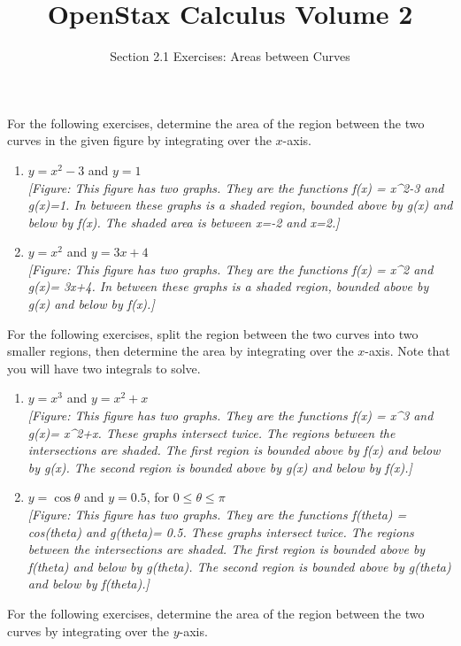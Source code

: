 \documentclass{exercises}
\title{OpenStax Calculus Volume 2}
\subtitle{Section 2.1 Exercises: Areas between Curves}
\author{}
\date{}
\begin{document}
\maketitle


For the following exercises, determine the area of the region between the two curves in the given figure by integrating over the $x$-axis.

\begin{enumerate}[start=1]
\item $y=x^{2}-3$ and $y=1$ \\ \textit{[Figure: This figure has two graphs. They are the functions f(x) = x\textasciicircum{}2-3 and g(x)=1. In between these graphs is a shaded region, bounded above by g(x) and below by f(x). The shaded area is between x=-2 and x=2.]}
\item $y=x^{2}$ and $y=3x+4$ \\ \textit{[Figure: This figure has two graphs. They are the functions f(x) = x\textasciicircum{}2 and g(x)= 3x+4. In between these graphs is a shaded region, bounded above by g(x) and below by f(x).]}
\end{enumerate}

For the following exercises, split the region between the two curves into two smaller regions, then determine the area by integrating over the $x$-axis. Note that you will have two integrals to solve.

\begin{enumerate}[resume]
\item $y=x^{3}$ and $y=x^{2}+x$ \\ \textit{[Figure: This figure has two graphs. They are the functions f(x) = x\textasciicircum{}3 and g(x)= x\textasciicircum{}2+x. These graphs intersect twice. The regions between the intersections are shaded. The first region is bounded above by f(x) and below by g(x). The second region is bounded above by g(x) and below by f(x).]}
\item $y=\cos \theta$ and $y=0.5$, for $0\le \theta \le \pi$ \\ \textit{[Figure: This figure has two graphs. They are the functions f(theta) = cos(theta) and g(theta)= 0.5. These graphs intersect twice. The regions between the intersections are shaded. The first region is bounded above by f(theta) and below by g(theta). The second region is bounded above by g(theta) and below by f(theta).]}
\end{enumerate}

For the following exercises, determine the area of the region between the two curves by integrating over the $y$-axis.
\end{document}
